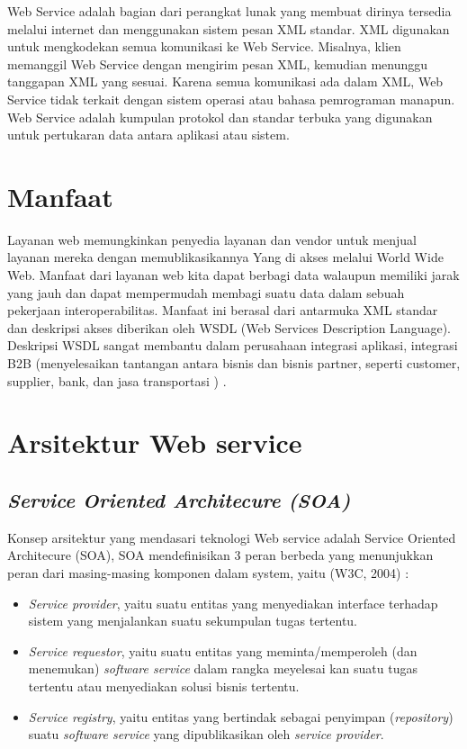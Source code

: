 	Web Service adalah bagian dari perangkat lunak yang membuat dirinya tersedia melalui internet dan menggunakan sistem pesan XML standar. XML digunakan untuk mengkodekan semua komunikasi ke Web Service. Misalnya, klien memanggil Web Service dengan mengirim pesan XML, kemudian menunggu tanggapan XML yang sesuai. Karena semua komunikasi ada dalam XML, Web Service tidak terkait dengan sistem operasi atau bahasa pemrograman manapun. Web Service adalah kumpulan protokol dan standar terbuka yang digunakan untuk pertukaran data antara aplikasi atau sistem\cite{sigit2017desain}.  

\section{Manfaat}

Layanan web memungkinkan penyedia layanan dan vendor untuk menjual layanan mereka dengan memublikasikannya
Yang di akses melalui World Wide Web.
Manfaat dari layanan web kita dapat berbagi data walaupun memiliki jarak yang jauh dan dapat mempermudah membagi suatu data dalam sebuah pekerjaan
interoperabilitas. Manfaat ini berasal dari antarmuka XML standar dan deskripsi akses
diberikan oleh WSDL (Web Services Description Language). Deskripsi WSDL sangat membantu dalam perusahaan
integrasi aplikasi, integrasi B2B (menyelesaikan tantangan antara bisnis dan bisnis partner, seperti customer, supplier, bank, dan jasa transportasi ) \cite{ferris2003web}.

\section{Arsitektur Web service}

\subsection{\textit{Service Oriented Architecure (SOA)} }

	Konsep arsitektur yang mendasari teknologi Web service adalah Service Oriented Architecure (SOA), SOA mendefinisikan 3 peran berbeda yang menunjukkan peran dari masing-masing komponen dalam system, yaitu (W3C, 2004) :
\begin{itemize}
\item \textit{Service provider}, yaitu suatu entitas yang menyediakan interface terhadap sistem yang menjalankan suatu sekumpulan tugas tertentu.
\item \textit{Service requestor}, yaitu suatu entitas yang meminta/memperoleh (dan menemukan) \textit{software service} dalam rangka meyelesai kan suatu tugas tertentu atau menyediakan solusi bisnis tertentu.
\item \textit{Service registry}, yaitu entitas yang bertindak sebagai penyimpan (\textit{repository}) suatu \textit{software service} yang dipublikasikan oleh \textit{service provider}\cite{hidayat2014penerapan}.
\end{itemize}

